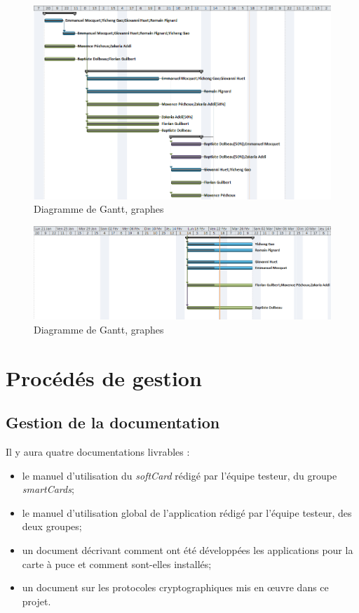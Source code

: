 \documentclass[a4paper,11pt,french]{article}
\begin{document}
\begin{center}
\begin{figure}[!h]
\includegraphics[scale=0.70]{ganttIteration13.PNG}
\caption{Diagramme de Gantt, graphes}
\end{figure}
\end{center}
\begin{center}
\begin{figure}[!h]
\includegraphics[scale=0.60]{ganttIteration4.png}
\caption{Diagramme de Gantt, graphes}
\end{figure}
\end{center}

\clearpage
\section{Procédés de gestion}

\subsection{Gestion de la documentation}
Il y aura quatre documentations livrables : 
\begin{itemize}
 \item le manuel d'utilisation du \emph{softCard} rédigé par l'équipe testeur,
 du groupe \emph{smartCards};
 \item le manuel d'utilisation global de l'application rédigé par l'équipe 
 testeur, des deux groupes;
 \item un document décrivant comment ont été développées les applications pour
 la carte à puce et comment sont-elles installés;
 \item un document sur les protocoles cryptographiques mis en \oe{}uvre
 dans ce projet.
\end{itemize}
\end{document}
